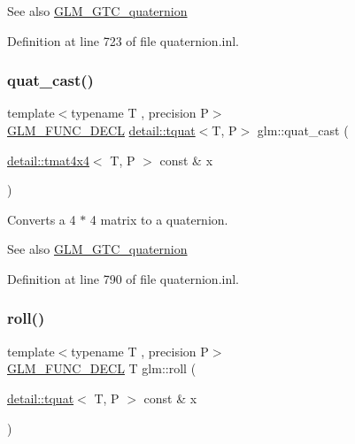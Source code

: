 \begin{DoxySeeAlso}{See also}
\hyperlink{group__gtc__quaternion}{G\+L\+M\+\_\+\+G\+T\+C\+\_\+quaternion} 
\end{DoxySeeAlso}


Definition at line 723 of file quaternion.\+inl.

\mbox{\label{group__gtc__quaternion_ga385af22ef1a45c4464ddd28b80d5ce18}} 
\subsubsection{\texorpdfstring{quat\+\_\+cast()}{quat\_cast()}\hspace{0.1cm}{\footnotesize\ttfamily [2/2]}}
{\footnotesize\ttfamily template$<$typename T , precision P$>$ \\
\hyperlink{setup_8hpp_ab2d052de21a70539923e9bcbf6e83a51}{G\+L\+M\+\_\+\+F\+U\+N\+C\+\_\+\+D\+E\+CL} \hyperlink{structglm_1_1detail_1_1tquat}{detail\+::tquat}$<$T, P$>$ glm\+::quat\+\_\+cast (\begin{DoxyParamCaption}\item[{\hyperlink{structglm_1_1detail_1_1tmat4x4}{detail\+::tmat4x4}$<$ T, P $>$ const \&}]{x }\end{DoxyParamCaption})}

Converts a 4 $\ast$ 4 matrix to a quaternion.

\begin{DoxySeeAlso}{See also}
\hyperlink{group__gtc__quaternion}{G\+L\+M\+\_\+\+G\+T\+C\+\_\+quaternion} 
\end{DoxySeeAlso}


Definition at line 790 of file quaternion.\+inl.

\mbox{\label{group__gtc__quaternion_ga6d883e423bc425f4334fcce202131f7e}} 
\subsubsection{\texorpdfstring{roll()}{roll()}}
{\footnotesize\ttfamily template$<$typename T , precision P$>$ \\
\hyperlink{setup_8hpp_ab2d052de21a70539923e9bcbf6e83a51}{G\+L\+M\+\_\+\+F\+U\+N\+C\+\_\+\+D\+E\+CL} T glm\+::roll (\begin{DoxyParamCaption}\item[{\hyperlink{structglm_1_1detail_1_1tquat}{detail\+::tquat}$<$ T, P $>$ const \&}]{x }\end{DoxyParamCaption})}

